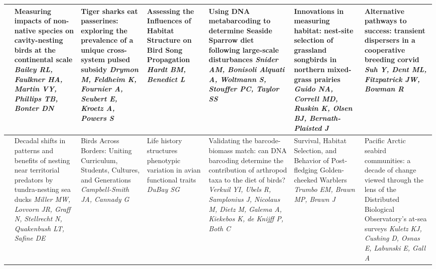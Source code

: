 \begin{tabular}{|x{0.75cm}|x{2.25cm}|x{2.25cm}|x{2.25cm}|x{2.25cm}|x{2.25cm}|x{2.25cm}|}
\hline
{}&Measuring impacts of non-native species on cavity-nesting birds at the continental scale \newline \newline \textit{Bailey RL, Faulkner HA, Martin VY, Phillips TB, Bonter DN} & Tiger sharks eat passerines: exploring the prevalence of a unique cross-system pulsed subsidy \newline \newline \textit{Drymon M, Feldheim K, Fournier A, Seubert E, Kroetz A, Powers S} & Assessing the Influences of Habitat Structure on Bird Song Propagation \newline \newline \textit{Hardt BM, Benedict L} & Using DNA metabarcoding to determine Seaside Sparrow diet following large-scale disturbances \newline \newline \textit{Snider AM, Bonisoli Alquati A, Woltmann S, Stouffer PC, Taylor SS} & Innovations in measuring habitat: nest-site selection of grassland songbirds in northern mixed-grass prairies \newline \newline \textit{Guido NA, Correll MD, Ruskin K, Olsen BJ, Bernath-Plaisted J} & Alternative pathways to success: transient dispersers in a cooperative breeding corvid \newline \newline \textit{Suh Y, Dent ML, Fitzpatrick JW, Bowman R}\\
\hline
{}&Decadal shifts in patterns and benefits of nesting near territorial predators by tundra-nesting sea ducks \newline \newline \textit{Miller MW, Lovvorn JR, Graff N, Stellrecht N, Quakenbush LT, Safine DE} & Birds Across Borders: Uniting Curriculum, Students, Cultures, and Generations \newline \newline \textit{Campbell-Smith JA, Cannady G} & Life history structures phenotypic variation in avian functional traits \newline \newline \textit{DuBay SG} & Validating the barcode-biomass match: can DNA barcoding determine the contribution of arthropod taxa to the diet of birds? \newline \newline \textit{Verkuil YI, Ubels R, Samplonius J, Nicolaus M, Dietz M, Galema A, Kiekebos K, de Knijff P, Both C} & Survival, Habitat Selection, and Behavior of Post-fledging Golden-cheeked Warblers \newline \newline \textit{Trumbo EM, Brawn MP, Brawn J} & Pacific Arctic seabird communities: a decade of change viewed through the lens of the Distributed Biological Observatory’s at-sea surveys \newline \newline \textit{Kuletz KJ, Cushing D, Osnas E, Labunski E, Gall A}\\

\end{tabular}
